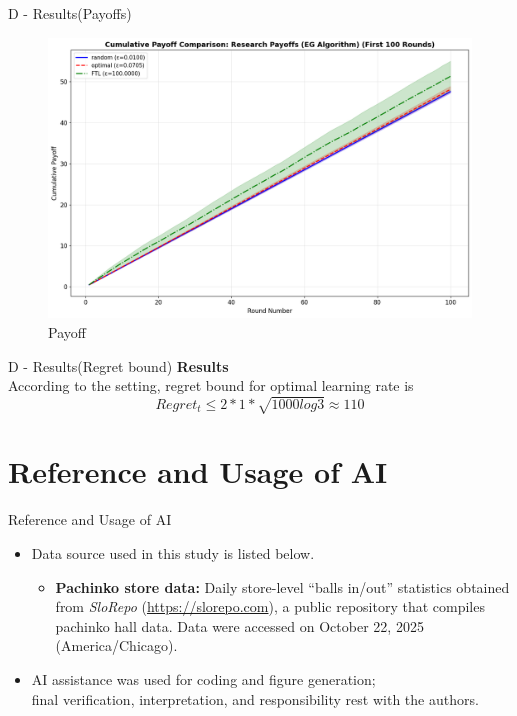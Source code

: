 \documentclass{beamer}
\begin{document}
\begin{frame}{D - Results(Payoffs)}
\begin{figure}
    \centering
    \includegraphics[width=0.5\linewidth]{332Project2/figures/RP_payoff.png}
    \caption{Payoff}
    \label{fig:placeholder}
\end{figure}
    
\end{frame}

\begin{frame}{D - Results(Regret bound)}
\textbf{Results}\\
    According to the setting, regret bound for optimal learning rate is
    \[
    Regret_t \leq 2 * 1 * \sqrt{1000log3} \approx 110
    \]
\end{frame}

\section{Reference and Usage of AI}

\begin{frame}{Reference and Usage of AI}
\begin{itemize}
    \item Data source used in this study is listed below.
    \begin{itemize}
        \item \textbf{Pachinko store data:} Daily store-level ``balls in/out'' statistics obtained from \emph{SloRepo} (\url{https://slorepo.com}), a public repository that compiles pachinko hall data. Data were accessed on October 22, 2025 (America/Chicago). 
    \end{itemize}

    \item AI assistance was used for coding and figure generation;\\
    final verification, interpretation, and responsibility rest with the authors.
\end{itemize}
\end{frame}
\end{document}
